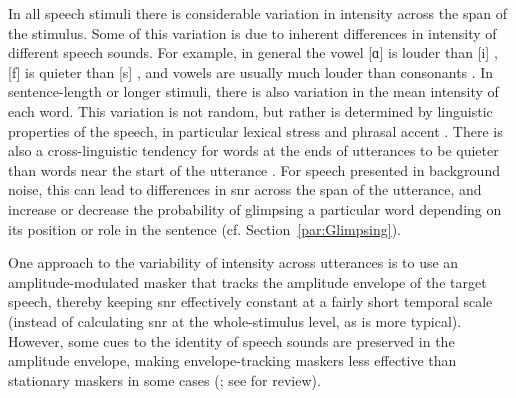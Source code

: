 In all speech stimuli there is considerable variation in intensity across the span of the stimulus.  Some of this variation is due to inherent differences in intensity of different speech sounds.  For example, in general the vowel [ɑ] is louder than [i] \citep{Ladefoged1967}, [f] is quieter than [s] \citep{sowl}, and vowels are usually much louder than consonants \citep{HoriiEtAl1971}.  In sentence-length or longer stimuli, there is also variation in the mean intensity of each word.  This variation is not random, but rather is determined by linguistic properties of the speech, in particular lexical stress and phrasal accent \citep{Fry1955, SluijterVanHeuven1996, PlagEtAl2011}.  There is also a cross-linguistic tendency for words at the ends of utterances to be quieter than words near the start of the utterance \citep{StrikBoves1995, TrouvainEtAl1998}.  For speech presented in background noise, this can lead to differences in \ac{snr} across the span of the utterance, and increase or decrease the probability of glimpsing a particular word depending on its position or role in the sentence (cf. Section~\ref{par:Glimpsing}).  

One approach to the variability of intensity across utterances is to use an amplitude-modulated masker that tracks the amplitude envelope of the target speech, thereby keeping \ac{snr} effectively constant at a fairly short temporal scale (instead of calculating \ac{snr} at the whole-stimulus level, as is more typical).  However, some cues to the identity of speech sounds are preserved in the amplitude envelope, making envelope-tracking maskers less effective than stationary maskers in some cases (\citealp{HoriiEtAl1971, VanTasellEtAl1987, BashfordEtAl1996}; see \citealp{Wright2004b} for review).


